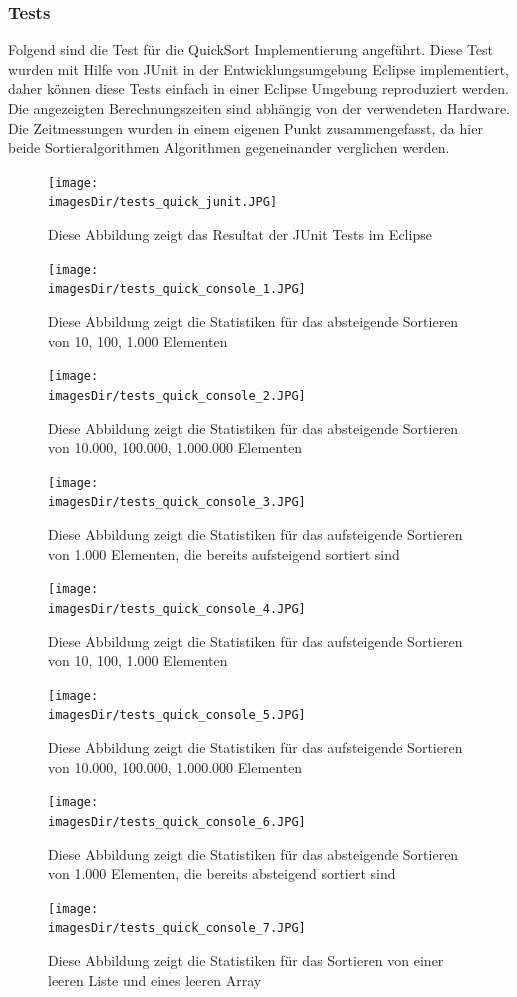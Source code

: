\documentclass[11pt, a4paper, twoside]{article}   	%
\newcommand{\imagesDir}{images}
\newcommand{\testSection}{Tests}
\newcommand{\testCommonText}{Diese Test wurden mit Hilfe von JUnit in der Entwicklungsumgebung Eclipse implementiert, daher können diese Tests einfach in einer Eclipse Umgebung reproduziert werden.\\ 
Die angezeigten Berechnungszeiten sind abhängig von der verwendeten Hardware.}
\newcommand{\testSortCommonText}{
Die Zeitmessungen wurden in einem eigenen Punkt zusammengefasst, da hier beide Sortieralgorithmen Algorithmen gegeneinander verglichen werden.
}
\begin{document}
\subsubsection{\testSection}
Folgend sind die Test für die QuickSort Implementierung angeführt.
\testCommonText\\
\testSortCommonText
\begin{figure}[h]
  \centering
  \texttt{[image: \\imagesDir/tests\_quick\_junit.JPG]}
  \caption
   {Diese Abbildung zeigt das Resultat der JUnit Tests im Eclipse}
\end{figure}
\newpage
\begin{figure}[h]
  \centering
  \texttt{[image: \\imagesDir/tests\_quick\_console\_1.JPG]}
  \caption
   {Diese Abbildung zeigt die Statistiken für das absteigende Sortieren von 10, 100, 1.000 Elementen}
\end{figure}
\newpage
\begin{figure}[h]
  \centering
  \texttt{[image: \\imagesDir/tests\_quick\_console\_2.JPG]}
  \caption
     {Diese Abbildung zeigt die Statistiken für das absteigende Sortieren von 10.000, 100.000, 1.000.000 Elementen}
\end{figure}
\newpage
\begin{figure}[h]
  \centering
  \texttt{[image: \\imagesDir/tests\_quick\_console\_3.JPG]}
  \caption
{Diese Abbildung zeigt die Statistiken für das aufsteigende Sortieren von 1.000 Elementen, die bereits aufsteigend sortiert sind}
\end{figure}
\newpage
\begin{figure}[h]
  \centering
  \texttt{[image: \\imagesDir/tests\_quick\_console\_4.JPG]}
  \caption
   {Diese Abbildung zeigt die Statistiken für das aufsteigende Sortieren von 10, 100, 1.000 Elementen}
\end{figure}
\newpage
\begin{figure}[h]
  \centering
  \texttt{[image: \\imagesDir/tests\_quick\_console\_5.JPG]}
  \caption
  {Diese Abbildung zeigt die Statistiken für das aufsteigende Sortieren von 10.000, 100.000, 1.000.000 Elementen}
\end{figure}
\newpage
\begin{figure}[h]
  \centering
  \texttt{[image: \\imagesDir/tests\_quick\_console\_6.JPG]}
  \caption
   {Diese Abbildung zeigt die Statistiken für das absteigende Sortieren von 1.000 Elementen, die bereits absteigend sortiert sind}
\end{figure}
\newpage
\begin{figure}[h]
  \centering
  \texttt{[image: \\imagesDir/tests\_quick\_console\_7.JPG]}
  \caption
   {Diese Abbildung zeigt die Statistiken für das Sortieren von einer leeren Liste und eines leeren Array}
\end{figure}
\end{document}
